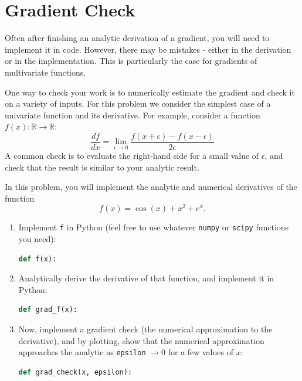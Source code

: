 \documentclass[submit]{harvardml}
\begin{document}
\section*{Gradient Check}
\begin{problem}
  Often after finishing an analytic derivation of a gradient, you will
  need to implement it in code.  However, there may be mistakes -
  either in the derivation or in the implementation. This is
  particularly the case for gradients of multivariate functions.

  \air

  \noindent One way to check your work is to numerically estimate the gradient
  and check it on a variety of inputs. For this problem we consider
  the simplest case of a univariate function and its derivative.  For
  example, consider a function $f(x): \mathbb{R} \to \mathbb{R}$:
$$\frac{d f}{d x} = \underset{\epsilon \to 0} \lim \frac{f(x + \epsilon) - f(x - \epsilon)}{2 \epsilon}$$
\noindent A common check is to evaluate the right-hand side for a small value of
$\epsilon$, and check that the result is similar to your analytic
result.\\

\smallskip

\noindent In this problem, you will implement the analytic and numerical derivatives of the function \[f(x) = \cos(x) + x^2 + e^x.\]

\begin{enumerate}
  \item Implement \texttt{f} in Python (feel free to use whatever \texttt{numpy} or \texttt{scipy} functions you need):
  \begin{lstlisting}[language=python]
  def f(x):

  \end{lstlisting}
  \item Analytically derive the derivative of that function, and implement it in Python:
  \begin{lstlisting}[language=python]
  def grad_f(x):

  \end{lstlisting}
  \item Now, implement a gradient check (the numerical approximation to the derivative), and by plotting, 
        show that the numerical approximation approaches the analytic as \texttt{epsilon} 
        $\to 0$ for a few values of $x$:
  \begin{lstlisting}[language=python]
  def grad_check(x, epsilon):

  \end{lstlisting}
\end{enumerate}
\end{problem}
\end{document}
